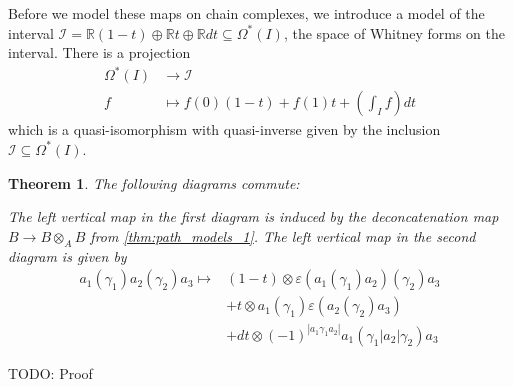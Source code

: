 \documentclass{scrartcl}
\theoremstyle{plain}
\newtheorem{theorem}{Theorem}[section]
\theoremstyle{definition}
\newcommand{\R}{\mathbb R}
\newcommand{\abs}[1]{\left\lvert#1\right\rvert}
\renewcommand{\subset}{\subseteq}
\DeclareMathOperator{\Map}{Map}
\begin{document}
Before we model these maps on chain complexes, we introduce a model of the interval $\mathcal I = \R (1-t) \oplus \R t \oplus \R dt\subset \Omega^*(I)$, the space of Whitney forms on the interval. There is a projection 
\begin{align*}
    \Omega^*(I) &\to \mathcal I\\
    f&\mapsto f(0)(1-t) + f(1) t + \left(\int_I f\right) dt
\end{align*}
which is a quasi-isomorphism with quasi-inverse given by the inclusion $\mathcal I \subset \Omega^*(I)$. 


\begin{theorem}
    The following diagrams commute:


    \qquad
    
    The left vertical map in the first diagram is induced by the deconcatenation map $B\to B\otimes_A B$ from \ref{thm:path_models_1}. The left vertical map in the second diagram is given by 
    \begin{align*}
        a_1(\gamma_1)a_2(\gamma_2)a_3 \mapsto &(1-t)\otimes \varepsilon(a_1(\gamma_1)a_2)(\gamma_2)a_3 \\&+ t\otimes a_1(\gamma_1)\varepsilon(a_2(\gamma_2)a_3) \\&+ dt\otimes (-1)^{\abs{a_1\gamma_1a_2}}a_1(\gamma_1|a_2|\gamma_2)a_3
    \end{align*}
\end{theorem}

TODO: Proof
\end{document}
